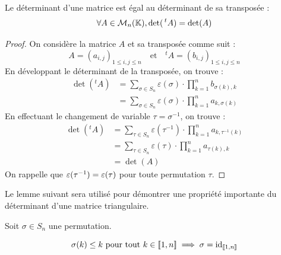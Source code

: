 \documentclass[12pt, a4paper]{report}
\begin{document}
\begin{property}
    Le déterminant d'une matrice est égal au déterminant de sa transposée :
    $$\forall A \in \mathcal M_n(\mathbb{K}), \det(\,^t A) = \det(A)$$
\end{property}

\begin{proof}
    On considère la matrice $A$ et sa transposée comme suit :
    $$A = (a_{i,j})_{1 \le i,j \le n} \quad \text{et} \quad ^t A = (b_{i,j})_{1 \le i,j \le n}$$
    En développant le déterminant de la transposée, on trouve :
    \begin{align*}
        \det(^t A) &= \sum_{\sigma \in S_n} \varepsilon(\sigma) \cdot \prod_{k=1}^{n} b_{\sigma(k), k} \\
        &= \sum_{\sigma \in S_n} \varepsilon(\sigma) \cdot \prod_{k=1}^{n} a_{k, \sigma(k)}
    \end{align*}
    En effectuant le changement de variable $\tau = \sigma^{-1}$, on trouve :
    \begin{align*}
        \det(^t A) &= \sum_{\tau \in S_n} \varepsilon(\tau^{-1}) \cdot \prod_{k=1}^{n} a_{k, \tau^{-1}(k)} \\
        &= \sum_{\tau \in S_n} \varepsilon(\tau) \cdot \prod_{k=1}^{n} a_{\tau(k), k} \\
        &= \det(A)
    \end{align*}
    On rappelle que $\varepsilon(\tau^{-1}) = \varepsilon(\tau)$ pour toute permutation $\tau$.
\end{proof}

Le lemme suivant sera utilisé pour démontrer une propriété importante du déterminant d'une matrice triangulaire. 

\begin{theorem}[Lemme]
    Soit $\sigma \in S_n$ une permutation.

    $$\sigma(k) \le k \text{ pour tout } k \in [\![1,n]\!] \implies \sigma = \mathrm{id}_{[\![1,n]\!]}$$
\end{theorem}
\end{document}
